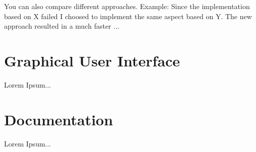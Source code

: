 You can also compare different approaches. Example: Since the implementation based on X failed I choosed to implement the same aspect based on Y. The new approach resulted in a much faster ...

\section{Graphical User Interface\label{sec:gui}}

Lorem Ipsum...

\section{Documentation\label{sec:docu}}

Lorem Ipsum...


